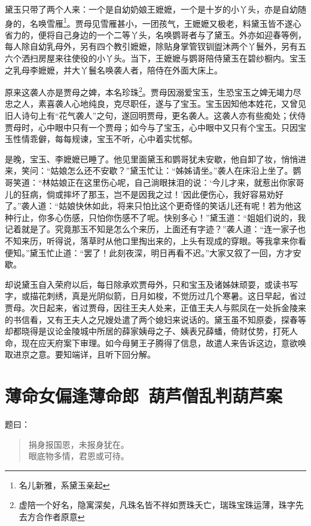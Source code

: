 \documentclass[12pt,oneside]{book}
\newenvironment{shici}{%
\begin{verse}%
\centering\large\hspace{12pt}}%
{\end{verse}}
\begin{document}
黛玉只带了两个人来：一个是自幼奶娘王嬷嬷，一个是十岁的小丫头，亦是自幼随身的，名唤雪雁\footnote{名儿新雅，系黛玉亲起}。贾母见雪雁甚小，一团孩气，王嬷嬷又极老，料黛玉皆不遂心省力的，便将自己身边的一个二等丫头，名唤鹦哥者与了黛玉。外亦如迎春等例，每人除自幼乳母外，另有四个教引嬷嬷，除贴身掌管钗钏盥沐两个丫鬟外，另有五六个洒扫房屋来往使役的小丫头。当下，王嬷嬷与鹦哥陪侍黛玉在碧纱橱内。宝玉之乳母李嬷嬷，并大丫鬟名唤袭人者，陪侍在外面大床上。

原来这袭人亦是贾母之婢，本名珍珠\footnote{虚陪一个好名，隐寓深矣，凡珠名皆不祥如贾珠夭亡，瑞珠宝珠运薄，珠字先去方合作者原意}。贾母因溺爱宝玉，生恐宝玉之婢无竭力尽忠之人，素喜袭人心地纯良，克尽职任，遂与了宝玉。宝玉因知他本姓花，又曾见旧人诗句上有“花气袭人”之句，遂回明贾母，更名袭人。这袭人亦有些痴处；伏侍贾母时，心中眼中只有一个贾母；如今与了宝玉，心中眼中又只有个宝玉。只因宝玉性情乖僻，每每规谏，宝玉不听，心中着实忧郁。

是晚，宝玉、李嬷嬷已睡了。他见里面黛玉和鹦哥犹未安歇，他自卸了妆，悄悄进来，笑问：“姑娘怎么还不安歇？”黛玉忙让：“姊姊请坐。”袭人在床沿上坐了。鹦哥笑道：“林姑娘正在这里伤心呢，自己淌眼抹泪的说：‘今儿才来，就惹出你家哥儿的狂病，倘或摔坏了那玉，岂不是因我之过！’因此便伤心，我好容易劝好了。”袭人道：“姑娘快休如此，将来只怕比这个更奇怪的笑话儿还有呢！若为他这种行止，你多心伤感，只怕你伤感不了呢。快别多心！”黛玉道：“姐姐们说的，我记着就是了。究竟那玉不知是怎么个来历，上面还有字迹？”袭人道：“连一家子也不知来历，听得说，落草时从他口里掏出来的，上头有现成的穿眼。等我拿来你看便知。”黛玉忙止道：“罢了！此刻夜深，明日再看不迟。”大家又叙了一回，方才安歇。

却说黛玉自入荣府以后，每日除承欢贾母外，只和宝玉及诸姊妹顽耍，或读书写字，或描花刺绣，真是光阴似箭，日月如梭，不觉历过几个寒暑。这日早起，省过贾母。次日起来，省过贾母，因往王夫人处来，正值王夫人与熙凤在一处拆金陵来的书信看，又有王夫人之兄嫂处遣了两个媳妇来说话的。黛玉虽不知原委，探春等却都晓得是议论金陵城中所居的薛家姨母之子、姨表兄薛蟠，倚财仗势，打死人命，现在应天府案下审理。如今母舅王子腾得了信息，故遣人来告诉这边，意欲唤取进京之意。要知端详，且听下回分解。


\chapter{薄命女偏逢薄命郎~葫芦僧乱判葫芦案}
题曰：

\begin{shici}
捐身报国恩，未报身犹在。\\
眼底物多情，君恩或可待。
\end{shici}
\end{document}
